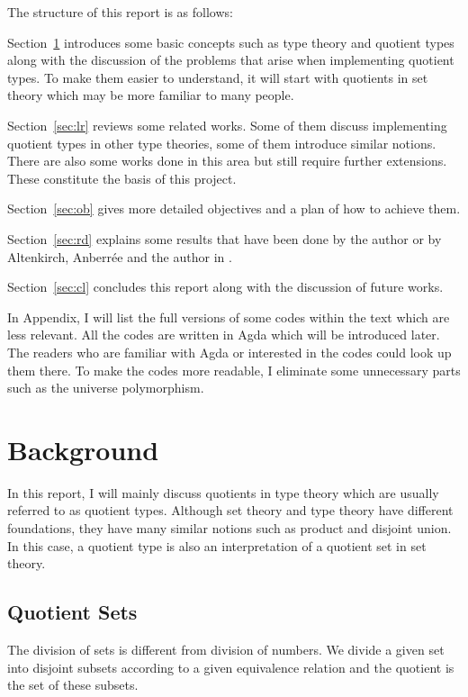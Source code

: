 \documentclass{article}
\theoremstyle{definition}
\begin{document}
The structure of this report is as follows:

Section~\ref{sec:bg} introduces some basic concepts such as type
theory and quotient types along with the discussion of the problems
that arise when implementing quotient types. To make them easier to understand, it
will start with quotients in set theory which may be
more familiar to many people. 

Section~\ref{sec:lr} reviews some related works. Some of them discuss
implementing quotient types in other type theories, some of them
introduce similar notions. There are also some works done in this area
but still require further extensions. These constitute the basis of this project.

Section~\ref{sec:ob} gives more detailed objectives and a plan of how
to achieve them.

Section~\ref{sec:rd} explains some results that have been done by the
author or by Altenkirch, Anberr\'{e}e and the author in \cite{aan}.

Section~\ref{sec:cl} concludes this report along with the discussion
of future works.

In Appendix, I will list the full versions of some codes within the
text which are less relevant. All the codes are written in Agda which
will be introduced later. The readers who are familiar with Agda
or interested in the codes could look up them there. To make the codes
more readable, I eliminate some unnecessary parts such as the universe polymorphism.

\section{Background}
\label{sec:bg}

In this report, I will mainly discuss quotients in type theory
which are usually referred to as quotient types. Although set theory and
type theory have different foundations, they have many similar
notions such as product and disjoint union.  In this case, a quotient type
is also an interpretation of a quotient set in set theory.

\subsection{Quotient Sets} 

The division of sets is different from division of numbers. We divide a
given set into disjoint subsets according to a given equivalence relation
and the quotient is the set of these subsets.
\end{document}
